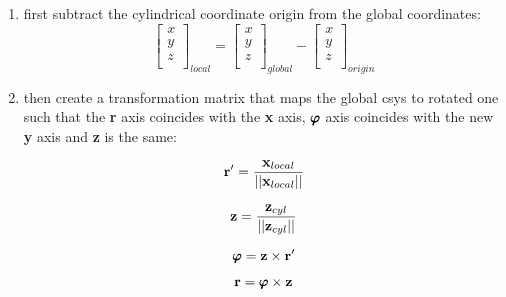 \begin{bbox}
    \begin{enumerate}
        \item first subtract the cylindrical coordinate origin from the global
            coordinates:
            \begin{equation}
                \begin{bmatrix}
                    x \\
                    y \\
                    z \\
                \end{bmatrix}_{local}
                = \begin{bmatrix}
                    x \\
                    y \\
                    z \\
                \end{bmatrix}_{global}
                - \begin{bmatrix}
                    x \\
                    y \\
                    z \\
                \end{bmatrix}_{origin}
            \end{equation}

        \item then create a transformation matrix that maps the global csys
            to rotated one such that the \textbf{r} axis coincides with the
            \textbf{x} axis, $ \pmb{\varphi} $ axis coincides with the new
            \textbf{y} axis and \textbf{z} is the same:

            \begin{equation}
                \mathbf{r}' = \frac{\mathbf{x}_{local}}{|| \mathbf{x}_{local} ||}
            \end{equation}

            \begin{equation}
                \mathbf{z} = \frac{\mathbf{z}_{cyl}}{|| \mathbf{z}_{cyl} ||}
            \end{equation}

            \begin{equation}
                \pmb{\varphi} = \mathbf{z} \times \mathbf{r}'
            \end{equation}

            \begin{equation}
                \mathbf{r} = \pmb{\varphi} \times \mathbf{z}
            \end{equation}


\end{enumerate}
\end{bbox}
